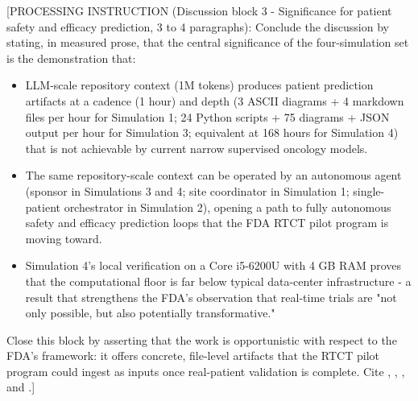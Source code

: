 [PROCESSING INSTRUCTION (Discussion block 3 - Significance for patient
safety and efficacy prediction, 3 to 4 paragraphs): Conclude the
discussion by stating, in measured prose, that the central significance
of the four-simulation set is the demonstration that:
\begin{itemize}[leftmargin=*]
\item LLM-scale repository context (1M tokens) produces patient
prediction artifacts at a cadence (1 hour) and depth (3 ASCII diagrams +
4 markdown files per hour for Simulation 1; 24 Python scripts + 75
diagrams + JSON output per hour for Simulation 3; equivalent at 168 hours
for Simulation 4) that is not achievable by current narrow supervised
oncology models.
\item The same repository-scale context can be operated by an autonomous
agent (sponsor in Simulations 3 and 4; site coordinator in Simulation 1;
single-patient orchestrator in Simulation 2), opening a path to fully
autonomous safety and efficacy prediction loops that the FDA RTCT pilot
program is moving toward.
\item Simulation 4's local verification on a Core i5-6200U with 4 GB RAM
proves that the computational floor is far below typical data-center
infrastructure - a result that strengthens the FDA's observation that
real-time trials are "not only possible, but also potentially
transformative."
\end{itemize}
Close this block by asserting that the work is opportunistic with respect
to the FDA's framework: it offers concrete, file-level artifacts that the
RTCT pilot program could ingest as inputs once real-patient validation is
complete. Cite \cite{fda2026realtime}, \cite{kawchak_2026_19176370},
\cite{kawchak_2026_19119939}, and \cite{kawchak_2026_19396256}.]
